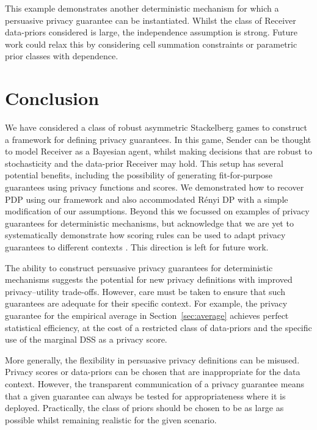 \documentclass{article}
\theoremstyle{plain}
\theoremstyle{plain}
\theoremstyle{definition}
\theoremstyle{remark}
\theoremstyle{plain}
\begin{document}
This example demonstrates another deterministic mechanism for which a persuasive privacy guarantee can be instantiated. Whilst the class of Receiver data-priors considered is large, the independence assumption is strong. Future work could relax this by considering cell summation constraints or parametric prior classes with dependence.

\section{Conclusion}

We have considered a class of robust asymmetric Stackelberg games to construct a framework for defining privacy guarantees. In this game, Sender can be thought to model Receiver as a Bayesian agent, whilst making decisions that are robust to stochasticity and the data-prior Receiver may hold. This setup has several potential benefits, including the possibility of generating fit-for-purpose guarantees using privacy functions and scores. We demonstrated how to recover PDP using our framework and also accommodated R\'{e}nyi DP with a simple modification of our assumptions. Beyond this we focussed on examples of privacy guarantees for deterministic mechanisms, but acknowledge that we are yet to systematically demonstrate how scoring rules can be used to adapt privacy guarantees to different contexts \citep[see in particular the literature on the difficulties in valuing privacy in real-world situations---e.g.,][]{acquistiEconomicsPrivacy2016, lindgreenPrivacyEconomicPerspective2018}. This direction is left for future work.

The ability to construct persuasive privacy guarantees for deterministic mechanisms suggests the potential for new privacy definitions with improved privacy--utility trade-offs. However, care must be taken to ensure that such guarantees are adequate for their specific context. For example, the privacy guarantee for the empirical average in Section~\ref{sec:average} achieves perfect statistical efficiency, at the cost of a restricted class of data-priors and the specific use of the marginal DSS as a privacy score.

More generally, the flexibility in persuasive privacy definitions can be misused. Privacy scores or data-priors can be chosen that are inappropriate for the data context. However, the transparent communication of a privacy guarantee means that a given guarantee can always be tested for appropriateness where it is deployed. Practically, the class of priors should be chosen to be as large as possible whilst remaining realistic for the given scenario. 
\end{document}
